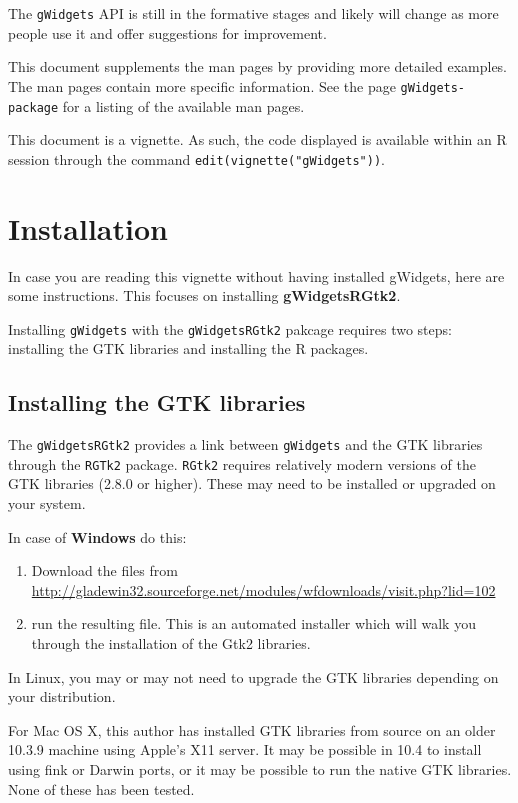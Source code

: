 \documentclass[12pt]{article}
\newcommand{\RCode}[1]{\texttt{#1}}
\newcommand{\RPackage}[1]{\textbf{#1}}
\begin{document}
The \RCode{gWidgets} API is still in the formative stages and likely will
change as more people use it and offer suggestions for improvement.

This document supplements the man pages by providing more detailed
examples. The man pages contain more specific information. See the 
page \RCode{gWidgets-package} for a listing of the available man pages.

This document is a vignette. As such, the code displayed is available
within an R session through the command
\RCode{edit(vignette("gWidgets"))}. 

\section{Installation}
In case you are reading this vignette without having installed
gWidgets, here are some instructions. This focuses on installing
\RPackage{gWidgetsRGtk2}. 

Installing \RCode{gWidgets} with the \RCode{gWidgetsRGtk2} pakcage
requires two steps: installing the GTK libraries and installing the R
packages.



\subsection{Installing the GTK libraries}

The \RCode{gWidgetsRGtk2} provides a link between \RCode{gWidgets} and
the GTK libraries through the \RCode{RGTk2} package.  \texttt{RGtk2}
requires relatively modern versions of the GTK libraries (2.8.0 or
higher). These may need to be installed or upgraded on your system.

In case of \textbf{Windows} do this:

\begin{enumerate}
\item 
 Download the files from
\href{http://gladewin32.sourceforge.net/modules/wfdownloads/visit.php?lid=102}{http://gladewin32.sourceforge.net/modules/wfdownloads/visit.php?lid=102}

\item run the resulting file.  This is an automated installer which will walk
you through the installation of the Gtk2 libraries.
\end{enumerate}

In Linux, you may or may not need to upgrade the GTK libraries
depending on your distribution.

For Mac OS X, this author has installed GTK libraries from source on an older
10.3.9 machine using Apple's X11 server. It may be possible in 10.4 to
install using fink or Darwin ports, or it may be possible to run the
native GTK libraries. None of these has been tested.
\end{document}
